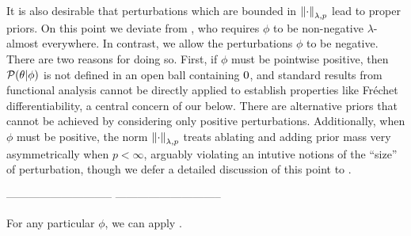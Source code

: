 It is also desirable that perturbations which are bounded in
$\left\Vert\cdot\right\Vert_{\lambda,p}$ lead to proper priors.  On this point we deviate from
\citep{gustafson:1996:local}, who requires $\phi$ to be non-negative
$\lambda$-almost everywhere.  In contrast, we allow the perturbations $\phi$ to
be negative. There are two reasons for doing so.  First, if $\phi$ must be
pointwise positive, then $\mathcal{P}(\theta \vert \phi)$ is not defined in an open ball
containing $0$, and standard results from functional analysis cannot be
directly applied to establish properties like Fr{\'e}chet differentiability, a
central concern of our  below.  There are alternative
priors that cannot be achieved by considering only positive perturbations.
Additionally, when $\phi$ must be positive, the norm $\left\Vert\cdot\right\Vert_{\lambda, p}$
treats ablating and adding prior mass very asymmetrically when $p < \infty$,
arguably violating an intutive notions of the ``size'' of perturbation, though
we defer a detailed discussion of this point to .


-----------------------------
-----------------------------

For any particular $\phi$, we can apply .
%


